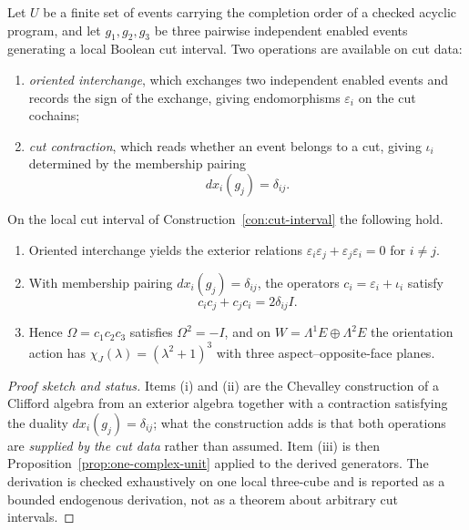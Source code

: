 \begin{construction}\label{con:cut-interval}
Let $U$ be a finite set of events carrying the completion order of a checked acyclic
program, and let $g_1,g_2,g_3$ be three pairwise independent enabled events
generating a local Boolean cut interval.  Two operations are available on cut data:
\begin{enumerate}
\item \emph{oriented interchange}, which exchanges two independent enabled events and
  records the sign of the exchange, giving endomorphisms $\varepsilon_i$ on the cut
  cochains;
\item \emph{cut contraction}, which reads whether an event belongs to a cut, giving
  $\iota_i$ determined by the membership pairing
  \[
    dx_i(g_j)=\delta_{ij}.
  \]
\end{enumerate}
\end{construction}

\begin{theorem}\label{thm:endogenous-clifford}
On the local cut interval of Construction~\ref{con:cut-interval} the following hold.
\begin{enumerate}
\item Oriented interchange yields the exterior relations
  $\varepsilon_i\varepsilon_j+\varepsilon_j\varepsilon_i=0$ for $i\neq j$.
\item With membership pairing $dx_i(g_j)=\delta_{ij}$, the operators
  $c_i=\varepsilon_i+\iota_i$ satisfy
  \[
    c_ic_j+c_jc_i=2\delta_{ij}I .
  \]
\item Hence $\Omega=c_1c_2c_3$ satisfies $\Omega^{2}=-I$, and on
  $W=\Lambda^{1}E\oplus\Lambda^{2}E$ the orientation action has
  $\chi_J(\lambda)=(\lambda^{2}+1)^{3}$ with three aspect--opposite-face planes.
\end{enumerate}
\end{theorem}

\begin{proof}[Proof sketch and status]
Items (i) and (ii) are the Chevalley construction of a Clifford algebra from an
exterior algebra together with a contraction satisfying the duality
$dx_i(g_j)=\delta_{ij}$; what the construction adds is that both operations are
\emph{supplied by the cut data} rather than assumed.  Item (iii) is then
Proposition~\ref{prop:one-complex-unit} applied to the derived generators.
The derivation is checked exhaustively on one local three-cube and is reported as a
bounded endogenous derivation, not as a theorem about arbitrary cut intervals.
\end{proof}

